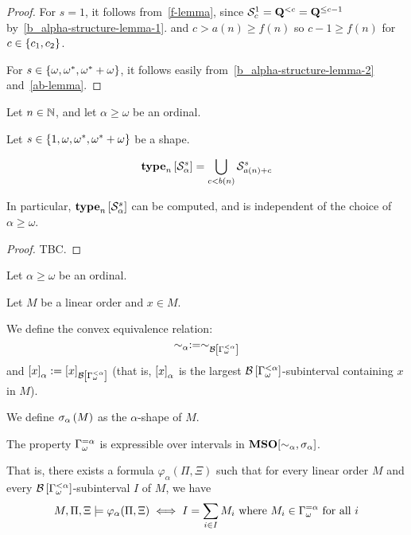 \begin{proof}
  For $s = 1$, it follows from~\cref{f-lemma}, since $\mathcal{S}^{1}_{c} = \mathbf{Q}^{< c} = \mathbf{Q}^{\le c-1}$
  by~\cref{b_alpha-structure-lemma-1}.
  and $c > a(n) \ge f(n)$ so $c-1 \ge f(n)$ for $c \in \left\{ {c_1, c_2} \right\}$.

  For $s \in \left\{ {\omega, \omega^\ast, \omega^\ast + \omega} \right\}$, it follows easily from~\cref{b_alpha-structure-lemma-2}
  and~\cref{ab-lemma}.
\end{proof}

\begin{lemma}
  Let $n \in \mathbb{N}$, and let $\alpha \ge \omega$ be an ordinal.

  Let $s \in \left\{ {1, \omega, \omega^\ast, \omega^\ast + \omega} \right\}$ be a shape.

  \[\mathbf{type}_{n} \left[ {\mathcal{S}^{s}_{\alpha}} \right] = \bigcup_{c < b(n)}{\mathcal{S}^{s}_{a(n) + c}                                                                                                                                                                                                                                                                                                                                                                                                                                       }\]

  In particular, $\mathbf{type}_{n} \left[ {\mathcal{S}^{s}_{\alpha}} \right]$ can be
  computed, and is independent of the choice of $\alpha \ge \omega$.
\end{lemma}

\begin{proof}
  TBC.
  
\end{proof}

\begin{definition}
  Let $\alpha \ge \omega$ be an ordinal.

  Let $M$ be a linear order and $x \in M$.

  We define the convex equivalence relation: 
  \[\sim_\alpha := \sim_{\mathcal{B} \left[ {{\Gamma_{\omega}^{< \alpha}}} \right]}\]
  and $\left[ {x} \right]_{\alpha} := \left[ {x} \right]_{\mathcal{B} \left[ {{\Gamma_{\omega}^{< \alpha}}} \right]}$ (that is,
  $\left[ {x} \right]_{\alpha}$ is the largest $\mathcal{B} \left[ {{\Gamma_{\omega}^{< \alpha}}} \right]$-subinterval
  containing $x$ in $M$).

  We define $\sigma_{\alpha} \left( {M} \right)$ as
  the $\alpha$-shape of $M$.
\end{definition}


\begin{lemma}
  The property
  $\Gamma_{\omega}^{= \alpha}$ is expressible over intervals
  in $\mathbf{MSO}[\sim_{\alpha}, \sigma_{\alpha}]$.

  That is, there exists a formula $\varphi_{\alpha}(\Pi, \Xi)$
  such that for every linear order $M$ and every $\mathcal{B} \left[ {{\Gamma_{\omega}^{< \alpha}}} \right]$-subinterval
  $I$ of $M$, we have
  \[
    M, \Pi, \Xi \models \varphi_{\alpha}(\Pi, \Xi) \iff
    I = \sum_{i \in I} M_i
    \text{ where } M_i \in \Gamma_{\omega}^{= \alpha} \text{ for all } i
  \]
\end{lemma}

